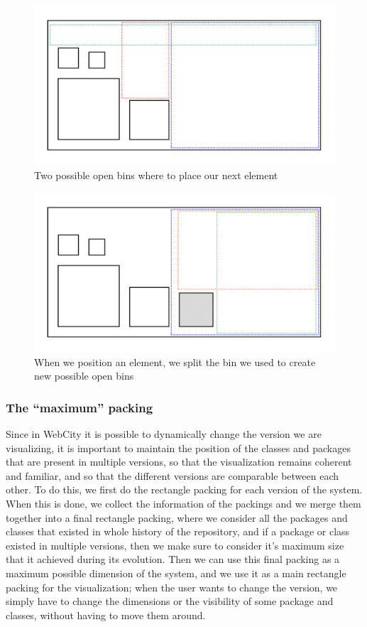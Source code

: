 \documentclass[]{usiinfbachelorproject}
\begin{document}
\begin{figure} [H]
\centering
\includegraphics[width=.7\textwidth]{pictures/bins.png}
\caption{Two possible open bins where to place our next element}
\label{fig:bins}
\end{figure}

\begin{figure} [H]
\centering
\includegraphics[width=.7\textwidth]{pictures/binsPlacing.png}
\caption{When we position an element, we split the bin we used to create new possible open bins}
\label{fig:binsPlacing}
\end{figure}

\subsubsection{The ``maximum'' packing} \label{The ``maximum'' packing}
Since in WebCity it is possible to dynamically change the version we are visualizing, it is important to maintain the position of the classes and packages that are present in multiple versions, so that the visualization remains coherent and familiar, and so that the different versions are comparable between each other.
To do this, we first do the rectangle packing for each version of the system. When this is done, we collect the information of the packings and we merge them together into a final rectangle packing, where we consider all the packages and classes that existed in whole history of the repository, and if a package or class existed in multiple versions, then we make sure to consider it's maximum size that it achieved during its evolution.
Then we can use this final packing as a maximum possible dimension of the system, and we use it as a main rectangle packing for the visualization; when the user wants to change the version, we simply have to change the dimensions or the visibility of some package and classes, without having to move them around.
\end{document}
